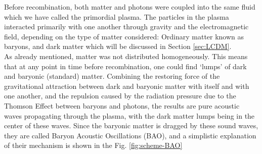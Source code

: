 Before recombination, both matter and photons were coupled into the same fluid which we have called the primordial plasma. The particles in the plasma interacted primarily with one another through gravity and the electromagnetic field, depending on the type of matter considered: Ordinary matter known as baryons, and dark matter which will be discussed in Section \ref{sec:LCDM}. \\

As already mentioned, matter was not distributed homogeneously. This means that at any point in time before recombination, one could find `lumps' of dark and baryonic (standard) matter. Combining the restoring force of the gravitational attraction between dark and baryonic matter with itself and with one another, and the repulsion caused by the radiation pressure due to the Thomson Effect between baryons and photons, the results are pure acoustic waves propagating through the plasma, with the dark matter lumps being in the center of these waves. Since the baryonic matter is dragged by these sound waves, they are called Baryon Acoustic Oscillations (BAO), and a simplistic explanation of their mechanism is shown in the Fig. \ref{fig:scheme-BAO} \\



